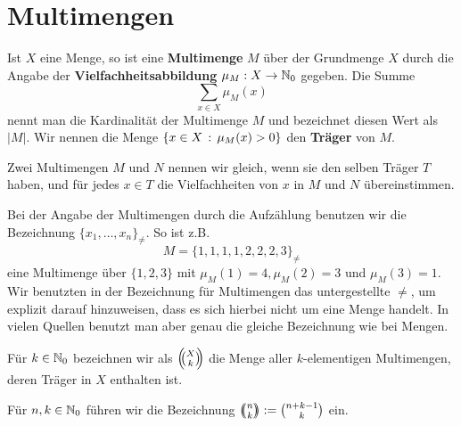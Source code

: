 \section{Multimengen} 

\begin{defn}
Ist $X$ eine Menge, so ist eine \textbf{Multimenge} $M$ über der Grundmenge $X$ durch die Angabe der \textbf{Vielfachheitsabbildung} $\mu_M : X \to \mathbb{N}_0$ gegeben. Die Summe
\[
	\sum_{x \in X} \mu_M(x)
\]
nennt man die Kardinalität der Multimenge $M$ und bezeichnet diesen Wert als $|M|$.  Wir nennen die Menge $\left\{  x \in X \,:\, \mu_M(x)>0 \right\}$ den \textbf{Träger} von $M$.

Zwei Multimengen $M$ und $N$ nennen wir gleich, wenn sie den selben Träger $T$ haben, und für jedes $x \in T$ die Vielfachheiten von $x$ in $M$ und $N$ übereinstimmen.
\end{defn} 

\begin{bem}
	Bei der Angabe der Multimengen durch die Aufzählung benutzen wir die Bezeichnung $\{x_1,\ldots,x_n\}_{\ne}$. So ist z.B. 
	\[
			M = \{1,1,1,1,2,2,2,3\}_{\ne}
	\]
	eine Multimenge über $\{1,2,3\}$ mit $\mu_M(1) =4, \mu_M(2)=3$ und $\mu_M(3)=1$. Wir benutzten in der Bezeichnung für Multimengen das untergestellte $\ne$, um explizit darauf hinzuweisen, dass es sich hierbei nicht um eine Menge handelt. In vielen Quellen benutzt man aber genau die gleiche Bezeichnung wie bei Mengen. 
\end{bem}

\begin{defn}
	Für $k \in \mathbb{N}_0$ bezeichnen wir als $\left(\!\!\binom{X}{k}\!\!\right)$ die Menge aller $k$-elementigen Multimengen, deren Träger in  $X$ enthalten ist. 

	Für $n,k \in \mathbb{N}_0$ führen wir die Bezeichnung $\left(\!\!\binom{n}{k}\!\!\right) := \binom{n+k-1}{k}$ ein. 
\end{defn} 

